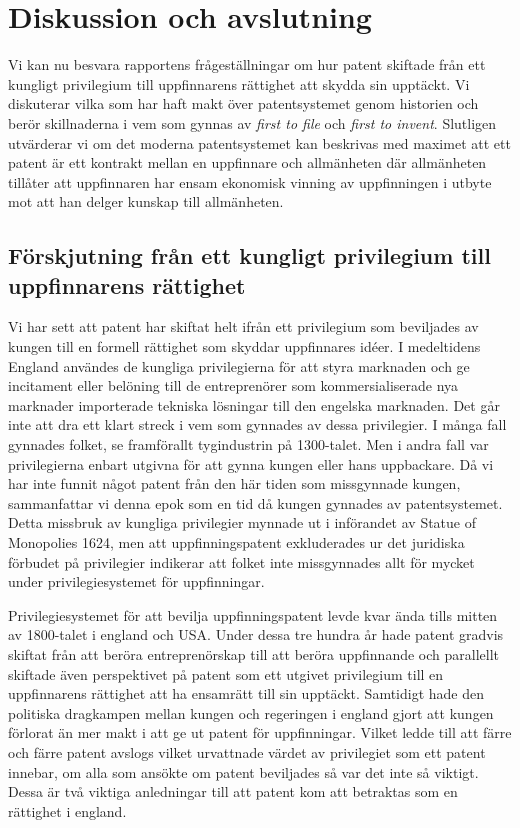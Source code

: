 \section{Diskussion och avslutning}
\label{sec:disk}



Vi kan nu besvara rapportens frågeställningar om hur patent skiftade från ett kungligt privilegium till uppfinnarens rättighet att skydda sin upptäckt. Vi diskuterar vilka som har haft makt över patentsystemet genom historien och berör skillnaderna i vem som gynnas av \emph{first to file} och \emph{first to invent}. Slutligen utvärderar vi om det moderna patentsystemet kan beskrivas med maximet att ett patent är ett kontrakt mellan en
uppfinnare och allmänheten där allmänheten tillåter att uppfinnaren har ensam
ekonomisk vinning av uppfinningen i utbyte mot att han delger kunskap till
allmänheten.


\subsection{Förskjutning från ett kungligt privilegium till uppfinnarens rättighet}
Vi har sett att patent har skiftat helt ifrån ett privilegium som beviljades av kungen till en formell rättighet som skyddar uppfinnares idéer. I medeltidens England användes de kungliga privilegierna för att styra marknaden och ge incitament eller belöning till de entreprenörer som kommersialiserade nya marknader importerade tekniska lösningar till den engelska marknaden. Det går inte att dra ett klart streck i vem som gynnades av dessa privilegier. I många fall gynnades folket, se framförallt tygindustrin på 1300-talet. Men i andra fall var privilegierna enbart utgivna för att gynna kungen eller hans uppbackare.%
Då vi har inte funnit något patent från den här tiden som missgynnade kungen, sammanfattar vi denna epok som en tid då kungen gynnades av patentsystemet. Detta missbruk av kungliga privilegier mynnade ut i införandet av Statue of Monopolies 1624, men att uppfinningspatent exkluderades ur det juridiska förbudet på privilegier indikerar att folket inte missgynnades allt för mycket under privilegiesystemet för uppfinningar.

Privilegiesystemet för att bevilja uppfinningspatent levde kvar ända tills mitten av 1800-talet i england och USA. Under dessa tre hundra år hade patent gradvis skiftat från att beröra entreprenörskap till att beröra uppfinnande och parallellt skiftade även perspektivet på patent som ett utgivet privilegium till en uppfinnarens rättighet att ha ensamrätt till sin upptäckt. Samtidigt hade den politiska dragkampen mellan kungen och regeringen i england gjort att kungen förlorat än mer makt i att ge ut patent för uppfinningar. Vilket ledde till att färre och färre patent avslogs vilket urvattnade värdet av privilegiet som ett patent innebar, om alla som ansökte om patent beviljades så var det inte så viktigt. Dessa är två viktiga anledningar till att patent kom att betraktas som en rättighet i england.

